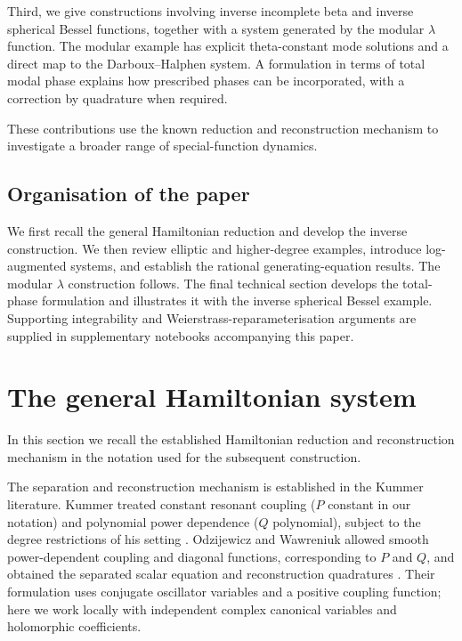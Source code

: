 \documentclass[11pt,a4paper]{article}
\numberwithin{equation}{section}
\begin{document}
Third, we give constructions involving inverse incomplete beta and inverse spherical Bessel functions, together with a system generated by the modular $\lambda$ function. The modular example has explicit theta-constant mode solutions and a direct map to the Darboux--Halphen system. A formulation in terms of total modal phase explains how prescribed phases can be incorporated, with a correction by quadrature when required.

These contributions use the known reduction and reconstruction mechanism to investigate a broader range of special-function dynamics.

\subsection{Organisation of the paper}
\label{sec:organisation}

We first recall the general Hamiltonian reduction and develop the inverse construction. We then review elliptic and higher-degree examples, introduce log-augmented systems, and establish the rational generating-equation results. The modular $\lambda$ construction follows. The final technical section develops the total-phase formulation and illustrates it with the inverse spherical Bessel example. Supporting integrability and Weierstrass-reparameterisation arguments are supplied in supplementary notebooks accompanying this paper.

\section{The general Hamiltonian system}
\label{sec:gen-ham-system}
In this section we recall the established Hamiltonian reduction and reconstruction mechanism in the notation used for the subsequent construction.

The separation and reconstruction mechanism is established in the Kummer literature. Kummer treated constant resonant coupling ($P$ constant in our notation) and polynomial power dependence ($Q$ polynomial), subject to the degree restrictions of his setting \cite{kummerResonantClassicalHamiltonians1990}. Odzijewicz and Wawreniuk allowed smooth power-dependent coupling and diagonal functions, corresponding to $P$ and $Q$, and obtained the separated scalar equation and reconstruction quadratures \cite[Section~2, especially Eq.~(2.31)]{odzijewiczClassicalQuantumKummer2016}. Their formulation uses conjugate oscillator variables and a positive coupling function; here we work locally with independent complex canonical variables and holomorphic coefficients.
\end{document}
